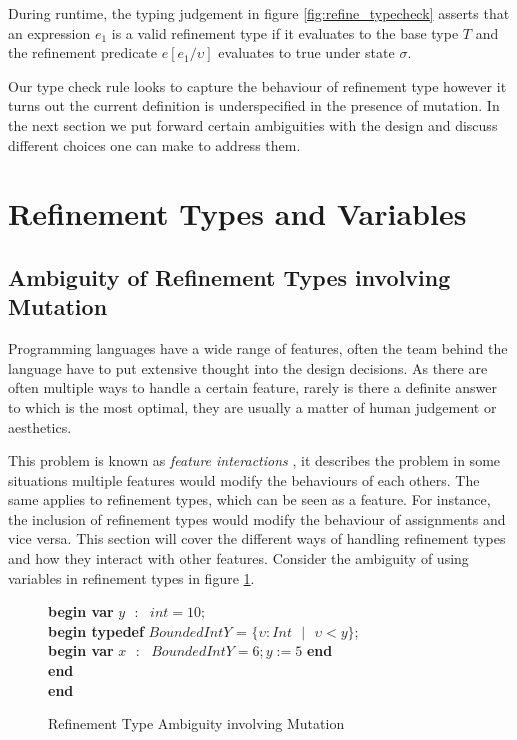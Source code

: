 \documentclass[a4paper,12pt]{report}
\newenvironment{tabs}[1]
 {\flushleft\TabPositions{#1}}
 {\endflushleft}
\begin{document}
\par
During runtime, the typing judgement in figure \ref{fig:refine_typecheck} 
asserts that an expression $e_1$ is a valid refinement type if it 
evaluates to the base type $T$ and the refinement predicate $e[e_1/\upsilon]$ 
evaluates to true under state $\sigma$.

\par
Our type check rule looks to capture the behaviour of refinement type however it 
turns out the current definition is underspecified in the presence of mutation. 
In the next section we put forward certain ambiguities with the 
design and discuss different choices one can make to address them.

\section{Refinement Types and Variables}
\subsection{Ambiguity of Refinement Types involving Mutation}
Programming languages have a wide range of features, often the team behind 
the language have to put extensive thought into the design decisions. As there 
are often multiple ways to handle a certain feature, rarely is there a definite 
answer to which is the most optimal, they are usually a matter of human judgement 
or aesthetics. 

\par
This problem is known as \textit{feature interactions} 
\cite{featInteract}, it describes the problem in some situations multiple 
features would modify the behaviours of each others. The same applies to 
refinement types, which can be seen as a feature. For instance, the inclusion 
of refinement types would modify the behaviour of assignments and vice versa. 
This section will cover the different ways of handling refinement types and how 
they interact with other features. Consider the ambiguity of using variables 
in refinement types in figure \ref{fig:amb_refinement_vars}.

\begin{figure} [H]
  \begin{tabs}{1cm,2cm}
    \textbf{begin var }$y\text{ }:\text{ } int = 10;$ \\
    \tab\textbf{begin typedef }$BoundedIntY$ = $\{\upsilon : Int\text{ }|\text{ } \upsilon  < y\}$; \\ 
    \tab\tab\textbf{begin var }$x\text{ }:\text{ }BoundedIntY = 6;y := 5$\textbf { end} \\
    \tab\textbf {end} \\
    \textbf{end}
  \end{tabs}  
  \caption{Refinement Type Ambiguity involving Mutation}
  \label{fig:amb_refinement_vars}
\end{figure}
\end{document}
